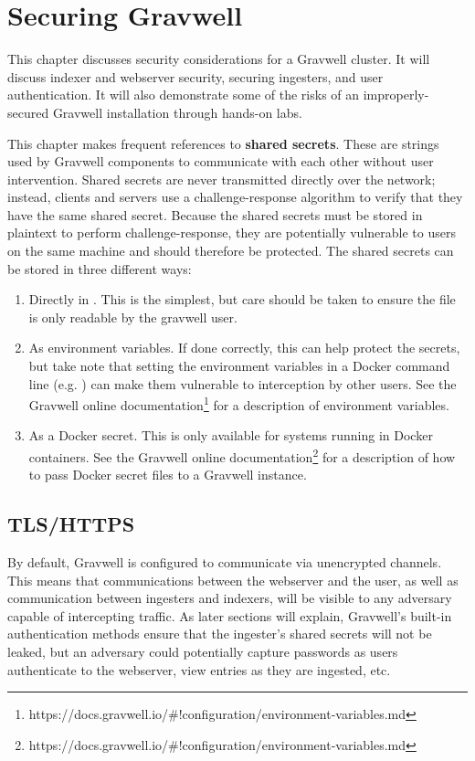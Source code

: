 \chapter{Securing Gravwell}
This chapter discusses security considerations for a Gravwell cluster.
It will discuss indexer and webserver security, securing ingesters, and
user authentication. It will also demonstrate some of the risks of an
improperly-secured Gravwell installation through hands-on labs.

This chapter makes frequent references to \textbf{shared secrets}. These are
strings used by Gravwell components to communicate with each other
without user intervention. Shared secrets are never transmitted directly
over the network; instead, clients and servers use a challenge-response
algorithm to verify that they have the same shared secret. Because the
shared secrets must be stored in plaintext to perform
challenge-response, they are potentially vulnerable to users on the same
machine and should therefore be protected. The shared secrets can be
stored in three different ways:

\begin{enumerate}
\tightlist
\item
  Directly in . This is the simplest, but care should
  be taken to ensure the file is only readable by the gravwell user.
\item
  As environment variables. If done correctly, this can help protect
  the secrets, but take note that setting the environment variables in a
  Docker command line (e.g. ) can
  make them vulnerable to interception by other users. See
  the Gravwell online documentation\footnote{https://docs.gravwell.io/\#!configuration/environment-variables.md} for a description of environment variables.
\item
  As a Docker secret. This is only available for systems running in
  Docker containers. See
  the Gravwell online documentation\footnote{https://docs.gravwell.io/\#!configuration/environment-variables.md} for a description of how to pass Docker secret files to a Gravwell instance.
\end{enumerate}



\section{TLS/HTTPS}
By default, Gravwell is configured to communicate via unencrypted
channels. This means that communications between the webserver and the
user, as well as communication between ingesters and indexers, will be
visible to any adversary capable of intercepting traffic. As later
sections will explain, Gravwell's built-in authentication methods ensure
that the ingester's shared secrets will not be leaked, but an adversary
could potentially capture passwords as users authenticate to the
webserver, view entries as they are ingested, etc.

